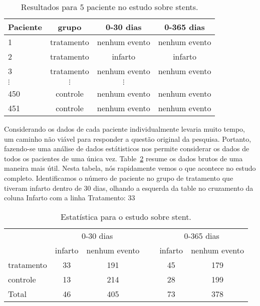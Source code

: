 \begin{table}[h]
\centering
\begin{tabular}{l ccc}
\hline
Paciente	&	grupo	&	0-30 dias 	&	0-365 dias \\
\hline
1		&	tratamento &	nenhum evento &	nenhum evento \\
2		&	tratamento &	infarto & infarto \\
3		&	tratamento &	nenhum evento & nenhum evento \\
$\vdots$	&	$\vdots$	  &	$\vdots$ \\
450	&	controle &	nenhum evento &	nenhum evento \\
451	&	controle &	nenhum evento &	nenhum evento \\
\hline
\end{tabular}
\caption{Resultados para 5 paciente no estudo sobre stents.}
\label{stentStudyResultsDF}
\end{table}
Considerando os dados de cada paciente individualmente levaria muito tempo, um caminho não viável para responder a questão original da pesquisa. Portanto, fazendo-se uma análise de dados estátisticos nos permite considerar os dados de todos os pacientes de uma única vez. Table~\ref{stentStudyResults} resume os dados brutos de uma maneira mais útil. Nesta tabela, nós rapidamente vemos o que acontece no estudo completo. Identificamos o número de paciente no grupo de tratamento que tiveram infarto dentro de 30 dias, olhando a esquerda da table no cruzamento da coluna Infarto com a linha Tratamento: 33

\begin{table}[h]
\centering
\begin{tabular}{l cc c cc}
& \multicolumn{2}{c}{0-30 dias} &\hspace{5mm}\ & \multicolumn{2}{c}{0-365 dias} \\
  \cline{2-3} \cline{5-6}
	& 	infarto 	& nenhum evento && 	infarto 	& nenhum evento \\
  \hline
tratamento 	& 33		& 191	&&	45 	& 179 \\
controle 		& 13		& 214	&& 	28	& 199 \\
  \hline
Total				& 46		& 405	&&	73	& 378 \\
  \hline
\end{tabular}
\caption{Estatística  para  o estudo sobre stent.}
\label{stentStudyResults}
\end{table}

